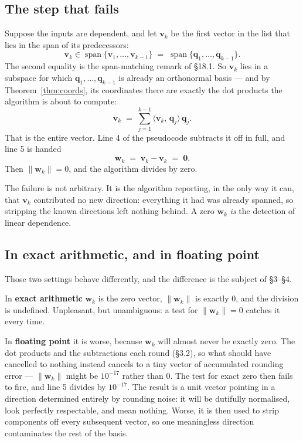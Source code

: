\documentclass[11pt]{article}
\theoremstyle{plain}
\theoremstyle{definition}
\theoremstyle{remark}
\newcommand{\vc}[1]{\mathbf{#1}}
\newcommand{\norm}[1]{\lVert #1\rVert}
\newcommand{\ip}[2]{\langle #1,\, #2\rangle}
\newcommand{\spn}{\operatorname{span}}
\begin{document}
\subsection{The step that fails}
Suppose the inputs are dependent, and let $\vc{v}_{k}$ be the first vector in
the list that lies in the span of its predecessors:
\[
  \vc{v}_{k}\in\spn\{\vc{v}_{1},\dots,\vc{v}_{k-1}\}
  \;=\;\spn\{\vc{q}_{1},\dots,\vc{q}_{k-1}\} .
\]
The second equality is the span-matching remark of \S18.1. So $\vc{v}_{k}$ lies
in a subspace for which $\vc{q}_{1},\dots,\vc{q}_{k-1}$ is already an orthonormal
basis --- and by Theorem~\ref{thm:coords}, its coordinates there are exactly the
dot products the algorithm is about to compute:
\[
  \vc{v}_{k} \;=\; \sum_{j=1}^{k-1}\ip{\vc{v}_{k}}{\vc{q}_{j}}\,\vc{q}_{j} .
\]
That is the entire vector. Line 4 of the pseudocode subtracts it off in full,
and line 5 is handed
\[
  \vc{w}_{k} \;=\; \vc{v}_{k} - \vc{v}_{k} \;=\; \vc{0} .
\]
Then $\norm{\vc{w}_{k}}=0$, and the algorithm divides by zero.

The failure is not arbitrary. It is the algorithm reporting, in the only way it
can, that $\vc{v}_{k}$ contributed no new direction: everything it had was
already spanned, so stripping the known directions left nothing behind. A zero
$\vc{w}_{k}$ \emph{is} the detection of linear dependence.

\subsection{In exact arithmetic, and in floating point}
Those two settings behave differently, and the difference is the subject of
\S3--\S4.

In \textbf{exact arithmetic} $\vc{w}_{k}$ is the zero vector, $\norm{\vc{w}_{k}}$
is exactly $0$, and the division is undefined. Unpleasant, but unambiguous: a
test for $\norm{\vc{w}_{k}}=0$ catches it every time.

In \textbf{floating point} it is worse, because $\vc{w}_{k}$ will almost never
be exactly zero. The dot products and the subtractions each round (\S3.2), so
what should have cancelled to nothing instead cancels to a tiny vector of
accumulated rounding error --- $\norm{\vc{w}_{k}}$ might be $10^{-17}$ rather
than $0$. The test for exact zero then fails to fire, and line 5 divides by
$10^{-17}$. The result is a unit vector pointing in a direction determined
entirely by rounding noise: it will be dutifully normalised, look perfectly
respectable, and mean nothing. Worse, it is then used to strip components off
every subsequent vector, so one meaningless direction contaminates the rest of
the basis.
\end{document}

